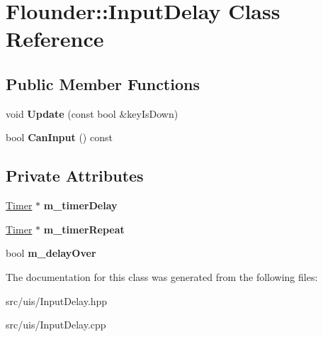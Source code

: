 \hypertarget{class_flounder_1_1_input_delay}{}\section{Flounder\+:\+:Input\+Delay Class Reference}
\label{class_flounder_1_1_input_delay}
\subsection*{Public Member Functions}
\begin{DoxyCompactItemize}
\item 
\mbox{\label{class_flounder_1_1_input_delay_a63c75c873dd6878849fc76a50e0de255}} 
void {\bfseries Update} (const bool \&key\+Is\+Down)
\item 
\mbox{\label{class_flounder_1_1_input_delay_af3443559d3cf96efbfdd7cc38049973c}} 
bool {\bfseries Can\+Input} () const
\end{DoxyCompactItemize}
\subsection*{Private Attributes}
\begin{DoxyCompactItemize}
\item 
\mbox{\label{class_flounder_1_1_input_delay_ab105ab3e249a1051896be6f284de7ae8}} 
\hyperlink{class_flounder_1_1_timer}{Timer} $\ast$ {\bfseries m\+\_\+timer\+Delay}
\item 
\mbox{\label{class_flounder_1_1_input_delay_ababe1e2e20ef10bbc3a09133e0b82675}} 
\hyperlink{class_flounder_1_1_timer}{Timer} $\ast$ {\bfseries m\+\_\+timer\+Repeat}
\item 
\mbox{\label{class_flounder_1_1_input_delay_a99c04d599b3e9d6201ffe663f880fb6a}} 
bool {\bfseries m\+\_\+delay\+Over}
\end{DoxyCompactItemize}


The documentation for this class was generated from the following files\+:\begin{DoxyCompactItemize}
\item 
src/uis/Input\+Delay.\+hpp\item 
src/uis/Input\+Delay.\+cpp\end{DoxyCompactItemize}
